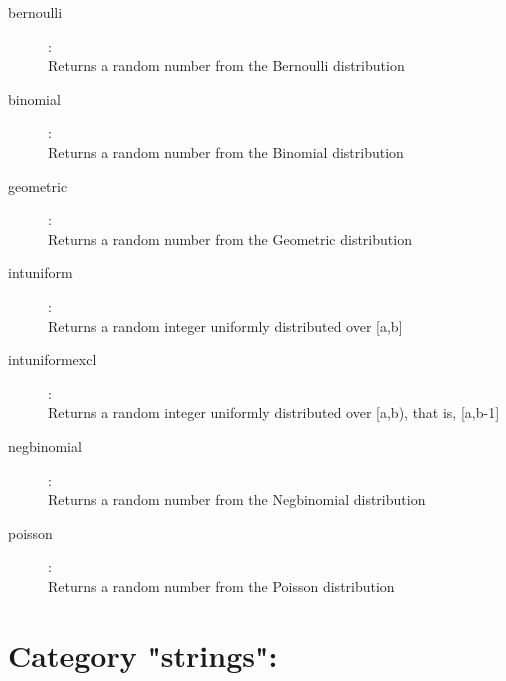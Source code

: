 \begin{description}
\item[bernoulli]:  \\
    Returns a random number from the Bernoulli distribution

\item[binomial]:  \\
    Returns a random number from the Binomial distribution

\item[geometric]:  \\
    Returns a random number from the Geometric distribution

\item[intuniform]:  \\
    Returns a random integer uniformly distributed over [a,b]

\item[intuniformexcl]:  \\
    Returns a random integer uniformly distributed over [a,b), that is, [a,b-1]

\item[negbinomial]:  \\
    Returns a random number from the Negbinomial distribution

\item[poisson]:  \\
    Returns a random number from the Poisson distribution


\end{description}

\section{Category "strings":}
\label{sec:ned-functions:category-strings}

